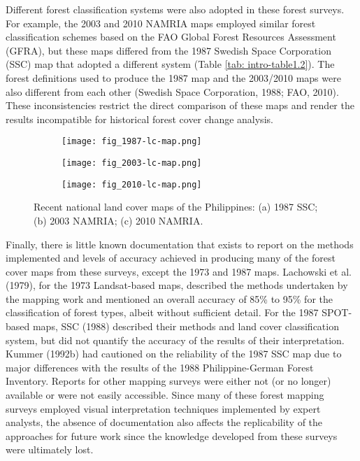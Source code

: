Different forest classification systems were also adopted in these forest surveys. For example, the 2003 and 2010 NAMRIA maps employed similar forest classification schemes based on the FAO Global Forest Resources Assessment (GFRA), but these maps differed from the 1987 Swedish Space Corporation (SSC) map that adopted a different system (Table \ref{tab: intro-table1.2}). The forest definitions used to produce the 1987 map and the 2003/2010 maps were also different from each other (Swedish Space Corporation, 1988; FAO, 2010). These inconsistencies restrict the direct comparison of these maps and render the results incompatible for historical forest cover change analysis.\\

\begin{figure}[!ht] \centering
	\captionsetup[subfigure]{width=2.0in} %
	\begin{subfigure}[t]{0.32\textwidth}
		\texttt{[image: fig\_1987-lc-map.png]}
		\caption[SSC/NAMRIA land cover maps.]{}
		\label{fig: intro-fig1.1a}
	\end{subfigure}
	\begin{subfigure}[t]{0.32\textwidth}
		\texttt{[image: fig\_2003-lc-map.png]}
		\caption[SSC/NAMRIA land cover maps.]{}
		\label{fig: intro-fig1.1b}
	\end{subfigure}
	\begin{subfigure}[t]{0.32\textwidth}
		\texttt{[image: fig\_2010-lc-map.png]}
		\caption[SSC/NAMRIA land cover maps.]{}
		\label{fig: intro-fig1.1c}
	\end{subfigure}
	\caption[Recent national land cover maps of the Philippines: (a) 1987 SSC; (b) 2003 NAMRIA; (c) 2010 NAMRIA.]{Recent national land cover maps of the Philippines: (a) 1987 SSC; (b) 2003 NAMRIA; (c) 2010 NAMRIA.}
	\label{fig: intro-fig1.1}
\end{figure}

Finally, there is little known documentation that exists to report on the methods implemented and levels of accuracy achieved in producing many of the forest cover maps from these surveys, except the 1973 and 1987 maps. Lachowski et al. (1979), for the 1973 Landsat-based maps, described the methods undertaken by the mapping work and mentioned an overall accuracy of 85\% to 95\% for the classification of forest types, albeit without sufficient detail. For the 1987 SPOT-based maps, SSC (1988) described their methods and land cover classification system, but did not quantify the accuracy of the results of their interpretation. Kummer (1992b) had cautioned on the reliability of the 1987 SSC map due to major differences with the results of the 1988 Philippine-German Forest Inventory. Reports for other mapping surveys were either not (or no longer) available or were not easily accessible. Since many of these forest mapping surveys employed visual interpretation techniques implemented by expert analysts, the absence of documentation also affects the replicability of the approaches for future work since the knowledge developed from these surveys were ultimately lost.

